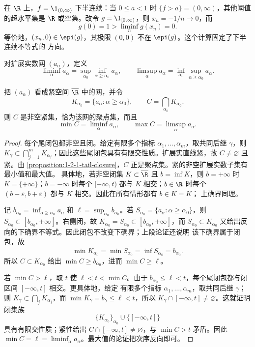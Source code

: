 \begin{example}[边界值决定上图是否闭]\label{ex:1-2-3-step-epigraph}
在 \(\R\) 上，\(f=\1_{(0,\infty)}\) 下半连续：当 \(0\le a<1\) 时
\(\{f>a\}=(0,\infty)\)，其他阈值的超水平集是 \(\R\) 或空集。改令
\(g=\1_{[0,\infty)}\)，则 \(x_n=-1/n\to0\)，而
\[
 g(0)=1>\liminf_ng(x_n)=0.
\]
等价地，\((x_n,0)\in\epi(g)\)，其极限 \((0,0)\) 不在 \(\epi(g)\)。这个计算固定了下半连续不等式的
方向。
\end{example}

\begin{definition}\label{def:1-2-3-2}
对扩展实数网 \((a_\alpha)\)，定义
\[
 \liminf_\alpha a_\alpha
 =\sup_{\alpha_0}\inf_{\alpha\ge\alpha_0}a_\alpha,\qquad
 \limsup_\alpha a_\alpha
 =\inf_{\alpha_0}\sup_{\alpha\ge\alpha_0}a_\alpha.
\]
\end{definition}

\begin{proposition}\label{proposition:1-2-3-tail-cluster}
把 \((a_\alpha)\) 看成紧空间 \(\overline\R\) 中的网，并令
\[
 K_{\alpha_0}=\overline{\{a_\alpha:\alpha\ge\alpha_0\}},
 \qquad C=\bigcap_{\alpha_0}K_{\alpha_0}.
\]
则 \(C\) 是非空紧集，恰为该网的聚点集，而且
\[
 \min C=\liminf_\alpha a_\alpha,\qquad
 \max C=\limsup_\alpha a_\alpha.
\]
\end{proposition}
\begin{proof}
每个尾闭包都非空且闭。给定有限多个指标 \(\alpha_1,\ldots,\alpha_m\)，取共同后继
\(\gamma\)，则
\(K_\gamma\subset\bigcap_{j=1}^mK_{\alpha_j}\)；因此这些尾闭包具有有限交性质。扩展实直线紧，故
\(C\ne\varnothing\) 且紧。由
\cref{proposition:1-2-1-tail-closure}，\(C\) 正是聚点集。紧的非空扩展实数子集有最小值和最大值。
具体地，若非空闭集 \(K\subset\overline\R\) 且 \(b=\inf K\)，则 \(b=+\infty\) 时
\(K=\{+\infty\}\)；\(b=-\infty\) 时每个
\([-\infty,t)\) 都与 \(K\) 相交；\(b\in\R\) 时每个
\((b-\varepsilon,b+\varepsilon)\) 都与 \(K\) 相交。因此在所有情形都有 \(b\in\overline K=K\)；
上确界同理。

记 \(b_{\alpha_0}=\inf_{\alpha\ge\alpha_0}a_\alpha\) 和
\(\ell=\sup_{\alpha_0}b_{\alpha_0}\)。若
\(S_{\alpha_0}=\{a_\alpha:\alpha\ge\alpha_0\}\)，则
\(S_{\alpha_0}\subset[b_{\alpha_0},+\infty]\)。右侧闭，故
\(K_{\alpha_0}=\overline{S_{\alpha_0}}\subset[b_{\alpha_0},+\infty]\)，而
\(S_{\alpha_0}\subset K_{\alpha_0}\) 又给出反向的下确界不等式。因此闭包不改变下确界；上段论证还说明
该下确界属于闭包，故
\[
  \min K_{\alpha_0}=\min\overline{S_{\alpha_0}}
  =\inf S_{\alpha_0}=b_{\alpha_0}.
\]
所以 \(C\subset K_{\alpha_0}\) 给出 \(\min C\ge b_{\alpha_0}\)，进而
\(\min C\ge\ell\)。

若 \(\min C>\ell\)，取 \(t\) 使 \(\ell<t<\min C\)。由于
\(b_{\alpha_0}\le\ell<t\)，每个尾闭包都与闭区间 \([-\infty,t]\) 相交。更具体地，给定
有限多个指标 \(\alpha_1,\ldots,\alpha_m\)，取共同后继 \(\gamma\)；则
\(K_\gamma\subset\bigcap_jK_{\alpha_j}\)，而
\(\min K_\gamma=b_\gamma\le\ell<t\)，所以
\(K_\gamma\cap[-\infty,t]\ne\varnothing\)。这就证明闭集族
\[
 \{K_{\alpha_0}\}_{\alpha_0}\cup\{[-\infty,t]\}
\]
具有有限交性质；紧性给出 \(C\cap[-\infty,t]\ne\varnothing\)，与 \(\min C>t\) 矛盾。因此
\(\min C=\ell=\liminf_\alpha a_\alpha\)。最大值的论证把次序反向即可。
\end{proof}

